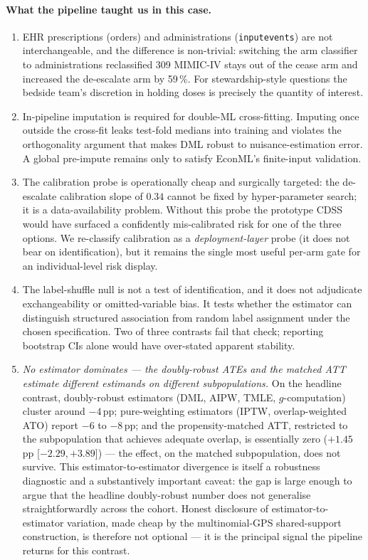 \documentclass[11pt,a4paper]{article}
\begin{document}
\paragraph{What the pipeline taught us in this case.}
\begin{enumerate}[leftmargin=*,itemsep=2pt]
\item EHR prescriptions (orders) and administrations (\texttt{inputevents}) are not interchangeable, and the difference is non-trivial: switching the arm classifier to administrations reclassified 309 MIMIC-IV stays out of the cease arm and increased the de-escalate arm by 59\,\%. For stewardship-style questions the bedside team's discretion in holding doses is precisely the quantity of interest.
\item In-pipeline imputation is required for double-ML cross-fitting. Imputing once outside the cross-fit leaks test-fold medians into training and violates the orthogonality argument that makes DML robust to nuisance-estimation error. A global pre-impute remains only to satisfy EconML's finite-input validation.
\item The calibration probe is operationally cheap and surgically targeted: the de-escalate calibration slope of $0.34$ cannot be fixed by hyper-parameter search; it is a data-availability problem. Without this probe the prototype CDSS would have surfaced a confidently mis-calibrated risk for one of the three options. We re-classify calibration as a \emph{deployment-layer} probe (it does not bear on identification), but it remains the single most useful per-arm gate for an individual-level risk display.
\item The label-shuffle null is not a test of identification, and it does not adjudicate exchangeability or omitted-variable bias. It tests whether the estimator can distinguish structured association from random label assignment under the chosen specification. Two of three contrasts fail that check; reporting bootstrap CIs alone would have over-stated apparent stability.
\item \emph{No estimator dominates --- the doubly-robust ATEs and the matched ATT estimate different estimands on different subpopulations.} On the headline contrast, doubly-robust estimators (DML, AIPW, TMLE, $g$-computation) cluster around $-4$\,pp; pure-weighting estimators (IPTW, overlap-weighted ATO) report $-6$ to $-8$\,pp; and the propensity-matched ATT, restricted to the subpopulation that achieves adequate overlap, is essentially zero ($+1.45$\,pp [$-2.29, +3.89$]) --- the effect, on the matched subpopulation, does not survive. This estimator-to-estimator divergence is itself a robustness diagnostic and a substantively important caveat: the gap is large enough to argue that the headline doubly-robust number does not generalise straightforwardly across the cohort. Honest disclosure of estimator-to-estimator variation, made cheap by the multinomial-GPS shared-support construction, is therefore not optional --- it is the principal signal the pipeline returns for this contrast.

\end{enumerate}
\end{document}

